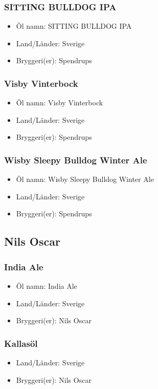 \documentclass[11pt]{article}
\begin{document}
\subsubsection{SITTING BULLDOG IPA}
\label{sec:orga0d44de}
\begin{itemize}
\item Öl namn: SITTING BULLDOG IPA
\item Land/Länder: Sverige
\item Bryggeri(er): Spendrups
\end{itemize}
\subsubsection{Visby Vinterbock}
\label{sec:org1ceb4bd}
\begin{itemize}
\item Öl namn: Visby Vinterbock
\item Land/Länder: Sverige
\item Bryggeri(er): Spendrups
\end{itemize}
\subsubsection{Wisby Sleepy Bulldog Winter Ale}
\label{sec:org2d0ab07}
\begin{itemize}
\item Öl namn: Wisby Sleepy Bulldog Winter Ale
\item Land/Länder: Sverige
\item Bryggeri(er): Spendrups
\end{itemize}
\subsection{Nils Oscar}
\label{sec:org1df3fc8}
\subsubsection{India Ale}
\label{sec:orgadfdb03}
\begin{itemize}
\item Öl namn: India Ale
\item Land/Länder: Sverige
\item Bryggeri(er): Nils Oscar
\end{itemize}
\subsubsection{Kallasöl}
\label{sec:orga10f547}
\begin{itemize}
\item Land/Länder: Sverige
\item Bryggeri(er): Nils Oscar
\end{itemize}
\end{document}
